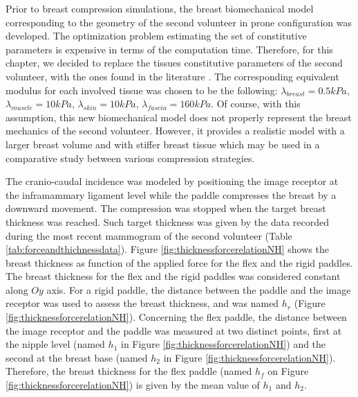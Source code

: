 Prior to breast compression simulations, the breast biomechanical model corresponding to the geometry of the second volunteer in prone configuration was developed. The optimization problem estimating the set of constitutive parameters is expensive in terms of the computation time.  Therefore, for this chapter, we decided to replace the tissues constitutive parameters of the second volunteer, with the ones found in the literature  \citep{han_nonlinear_2014,  rajagopal_modelling_2007, gefen_mechanics_2007}. The corresponding equivalent modulus for each involved tissue was chosen to be the following: $\lambda_{breast}=0.5 kPa$, $\lambda_{muscle}= 10kPa$, $\lambda_{skin}=10kPa$, $\lambda_{fascia}= 160kPa$.  Of course, with this assumption, this new biomechanical model does not properly represent the breast mechanics of the second volunteer.  However, it provides a realistic model with a larger breast volume and with stiffer breast tissue which may be used in a comparative study between various compression strategies.     

The cranio-caudal incidence was modeled by positioning the image receptor at the inframammary ligament level while the paddle compresses the breast by a downward movement. The compression was stopped when the target breast thickness was reached. Such target thickness was given by the data recorded during the most recent mammogram of the second volunteer (Table \ref{tab:forceandthichnessdata}). Figure \ref{fig:thicknessforcerelationNH} shows the breast thickness as function of the applied force for the flex and the rigid paddles. The breast thickness for the flex and the rigid paddles was considered constant along $Oy$ axis. For a rigid paddle, the distance between the paddle and the image receptor was used to assess the breast thickness, and was named $h_r$  (Figure \ref{fig:thicknessforcerelationNH}). Concerning the flex paddle, the distance between the image receptor and the paddle was measured at two distinct points, first at the nipple level (named $h_1$ in Figure \ref{fig:thicknessforcerelationNH}) and the second at the breast base (named $h_2$ in Figure \ref{fig:thicknessforcerelationNH}). Therefore, the breast thickness for the flex paddle (named $h_f$ on Figure \ref{fig:thicknessforcerelationNH}) is given by the mean value of $h_1$ and $h_2$. 
 
